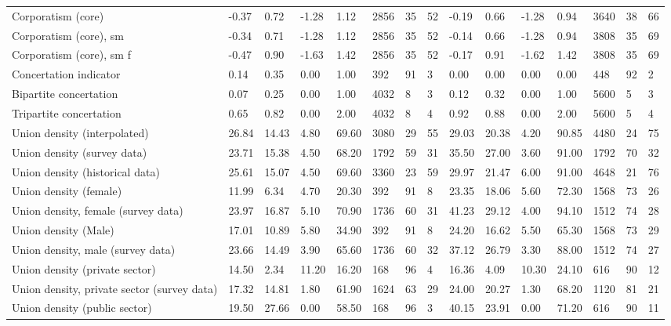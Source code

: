 \begin{longtable}{lllllllllllllll}
Corporatism (core) & -0.37 & 0.72 & -1.28 & 1.12 & 2856 & 35 & 52 & -0.19 & 0.66 & -1.28 & 0.94 & 3640 & 38 & 66\\
\addlinespace
Corporatism (core), sm & -0.34 & 0.71 & -1.28 & 1.12 & 2856 & 35 & 52 & -0.14 & 0.66 & -1.28 & 0.94 & 3808 & 35 & 69\\
Corporatism (core), sm f & -0.47 & 0.90 & -1.63 & 1.42 & 2856 & 35 & 52 & -0.17 & 0.91 & -1.62 & 1.42 & 3808 & 35 & 69\\
Concertation indicator & 0.14 & 0.35 & 0.00 & 1.00 & 392 & 91 & 3 & 0.00 & 0.00 & 0.00 & 0.00 & 448 & 92 & 2\\
Bipartite concertation & 0.07 & 0.25 & 0.00 & 1.00 & 4032 & 8 & 3 & 0.12 & 0.32 & 0.00 & 1.00 & 5600 & 5 & 3\\
Tripartite concertation & 0.65 & 0.82 & 0.00 & 2.00 & 4032 & 8 & 4 & 0.92 & 0.88 & 0.00 & 2.00 & 5600 & 5 & 4\\
\addlinespace
Union density (interpolated) & 26.84 & 14.43 & 4.80 & 69.60 & 3080 & 29 & 55 & 29.03 & 20.38 & 4.20 & 90.85 & 4480 & 24 & 75\\
Union density (survey data) & 23.71 & 15.38 & 4.50 & 68.20 & 1792 & 59 & 31 & 35.50 & 27.00 & 3.60 & 91.00 & 1792 & 70 & 32\\
Union density (historical data) & 25.61 & 15.07 & 4.50 & 69.60 & 3360 & 23 & 59 & 29.97 & 21.47 & 6.00 & 91.00 & 4648 & 21 & 76\\
Union density (female) & 11.99 & 6.34 & 4.70 & 20.30 & 392 & 91 & 8 & 23.35 & 18.06 & 5.60 & 72.30 & 1568 & 73 & 26\\
Union density, female (survey data) & 23.97 & 16.87 & 5.10 & 70.90 & 1736 & 60 & 31 & 41.23 & 29.12 & 4.00 & 94.10 & 1512 & 74 & 28\\
\addlinespace
Union density (Male) & 17.01 & 10.89 & 5.80 & 34.90 & 392 & 91 & 8 & 24.20 & 16.62 & 5.50 & 65.30 & 1568 & 73 & 29\\
Union density, male (survey data) & 23.66 & 14.49 & 3.90 & 65.60 & 1736 & 60 & 32 & 37.12 & 26.79 & 3.30 & 88.00 & 1512 & 74 & 27\\
Union density (private sector) & 14.50 & 2.34 & 11.20 & 16.20 & 168 & 96 & 4 & 16.36 & 4.09 & 10.30 & 24.10 & 616 & 90 & 12\\
Union density, private sector (survey data) & 17.32 & 14.81 & 1.80 & 61.90 & 1624 & 63 & 29 & 24.00 & 20.27 & 1.30 & 68.20 & 1120 & 81 & 21\\
Union density (public sector) & 19.50 & 27.66 & 0.00 & 58.50 & 168 & 96 & 3 & 40.15 & 23.91 & 0.00 & 71.20 & 616 & 90 & 11\\

\end{longtable}
